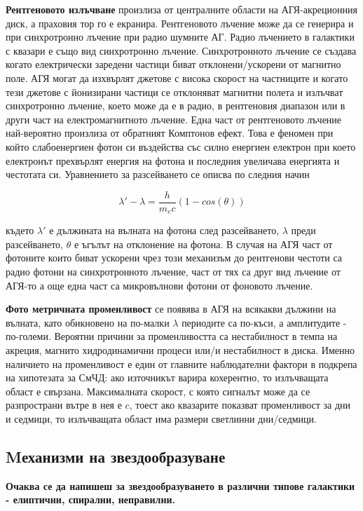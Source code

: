 \documentclass[a4paper,12pt]{article}
\begin{document}
\textbf{Рентгеновото излъчване} произлиза от централните области на АГЯ-акреционния диск, а праховия тор го е екранира. Рентгеновото лъчение може да се генерира и при синхротронно лъчение при радио шумните АГ. Радио лъчението в галактики с квазари е също вид синхротронно лъчение. Синхротронното лъчение се създава когато електрически заредени частици биват отклонени/ускорени от магнитно поле. АГЯ могат да изхвърлят джетове с висока скорост на частниците и когато тези джетове с йонизирани частици се отклоняват магнитни полета и излъчват синхротронно лъчение, което може да е в радио, в рентгеновия диапазон или в други част на електромагнитното лъчение. Една част от рентгеновото лъчение най-вероятно произлиза от обратният Комптонов ефект. Това е феномен при който слабоенергиен фотон си въздейства със силно енергиен електрон при което електронът прехвърлят енергия на фотона и последния увеличава енергията и честотата си. Уравнението за разсейването се описва по следния начин

\begin{equation}
    \lambda' - \lambda = \frac{h}{m_e c} (1-cos(\theta))
\end{equation}

където $\lambda'$ е дължината на вълната на фотона след разсейването, $\lambda$ преди разсейването, $\theta$ е ъгълът на отклонение на фотона. В случая на АГЯ част от фотоните които биват ускорени чрез този механизъм до рентгенови честоти са радио фотони на синхротронното лъчение, част от тях са друг вид лъчение от АГЯ-то а още една част са микровълнови фотони от фоновото лъчение.

\textbf{Фото метричната променливост} се появява в АГЯ на всякакви дължини на вълната, като обикновено на по-малки $\lambda$ периодите са по-къси, а амплитудите - по-големи. Вероятни причини за променливостта са нестабилност в темпа на акреция, магнито хидродинамични процеси или/и нестабилност в диска. Именно наличието на променливост е един от главните наблюдателни фактори в подкрепа на хипотезата за СмЧД: ако източникът варира кохерентно, то излъчващата област е свързана. Максималната скорост, с която сигналът може да се разпространи вътре в нея е $c$, тоест ако квазарите показват променливост за дни и седмици, то излъчващата област има размери светлинни дни/седмици.

\subsection{Mеханизми на звездообразуване}
\textbf{Очаква се да напишеш за звездообразуването в различни типове галактики - елиптични, спирални, неправилни.
}\\
\end{document}
